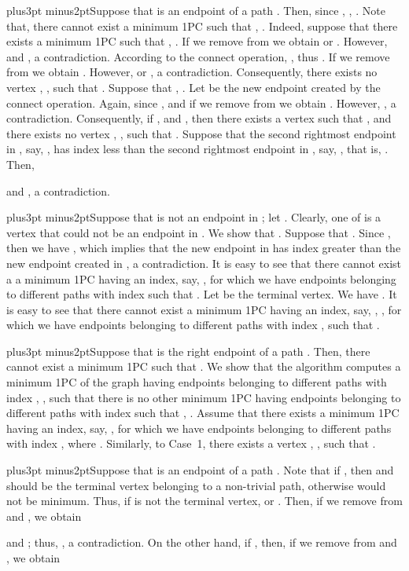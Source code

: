\documentclass[10pt]{article}
\def\yskip{\penalty-50\vskip3pt plus3pt minus2pt}
\def\y{\yskip}
\begin{document}
{\y Suppose that  is an endpoint of a path . Then, since
, ,
. Note that, there cannot exist a minimum
1PC  such that
, . Indeed, suppose that there exists a minimum 1PC
 such that , . If we remove
 from  we obtain
 or
.
However, 
and , a
contradiction. According to the connect operation, , thus . If we remove  from
 we obtain
.
However,  or
, a
contradiction. Consequently, there exists no vertex , , such that
. Suppose that
, .
Let  be the new endpoint created by the connect operation.
Again, since ,  and if we
remove  from  we obtain
.
However, , a
contradiction. Consequently, if ,  and
,  then there exists a vertex  such that
, 
and there exists no vertex , , such
that . Suppose
that the second rightmost endpoint in
, say, , has index less than
the second rightmost endpoint in ,
say, , that is, . Then,

and , a
contradiction.

\y Suppose that  is not an endpoint in
; let . Clearly, one of  is a vertex
that could not be an endpoint in .
We show that . Suppose that . Since ,
then we have
, which
implies that the new endpoint in 
has index greater than the new endpoint created in
, a contradiction. It is easy to see
that there cannot exist a a minimum 1PC
 having an index, say, , for
which we have  endpoints 
belonging to different paths with index  such
that . Let
 be the terminal vertex. We have
. It is easy
to see that there cannot exist a minimum 1PC
 having an index, say, , , for which we have  endpoints
 belonging to different paths with index , such that
.

\y Suppose that  is the right endpoint of a path . Then, there cannot
exist a minimum 1PC  such that .
We show that the algorithm computes a minimum 1PC
 of the graph  having
 endpoints  belonging to different
paths with index , , such that
there is no other minimum 1PC 
having  endpoints  belonging to
different paths with index  such that
, .
Assume that there exists a minimum 1PC
 having an index, say, , for
which we have  endpoints 
belonging to different paths with index ,
where .
Similarly, to Case~1, there exists a vertex , , such that .

\y Suppose that  is an endpoint of a path . Note that if
, then  and  should be
the terminal vertex belonging to a non-trivial path, otherwise
 would not be minimum. Thus, if
 is not the terminal vertex,  or
. Then, if we remove  from
 and
, we obtain

and ; thus,
, a
contradiction. On the other hand, if , then, if we
remove  from  and
, we obtain

}
\end{document}
